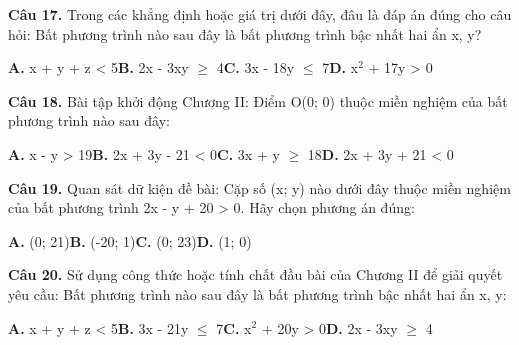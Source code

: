 \documentclass[11pt,a4paper]{article}
\begin{document}
\textbf{\color{primary} Câu 17.} Trong các khẳng định hoặc giá trị dưới đây, đâu là đáp án đúng cho câu hỏi: Bất phương trình nào sau đây là bất phương trình bậc nhất hai ẩn x, y?\par
\hspace*{1.5em}\textbf{A.} x + y + z < 5\quad\quad \textbf{B.} 2x - 3xy $\ge$ 4\quad\quad \textbf{C.} 3x - 18y $\le$ 7\quad\quad \textbf{D.} x$^2$ + 17y > 0\par\vspace{2pt}
\textbf{\color{primary} Câu 18.} Bài tập khởi động Chương II: Điểm O(0; 0) thuộc miền nghiệm của bất phương trình nào sau đây:\par
\hspace*{1.5em}\textbf{A.} x - y > 19\quad\quad \textbf{B.} 2x + 3y - 21 < 0\quad\quad \textbf{C.} 3x + y $\ge$ 18\quad\quad \textbf{D.} 2x + 3y + 21 < 0\par\vspace{2pt}
\textbf{\color{primary} Câu 19.} Quan sát dữ kiện đề bài: Cặp số (x; y) nào dưới đây thuộc miền nghiệm của bất phương trình 2x - y + 20 > 0. Hãy chọn phương án đúng:\par
\hspace*{1.5em}\textbf{A.} (0; 21)\quad\quad \textbf{B.} (-20; 1)\quad\quad \textbf{C.} (0; 23)\quad\quad \textbf{D.} (1; 0)\par\vspace{2pt}
\textbf{\color{primary} Câu 20.} Sử dụng công thức hoặc tính chất đầu bài của Chương II để giải quyết yêu cầu: Bất phương trình nào sau đây là bất phương trình bậc nhất hai ẩn x, y:\par
\hspace*{1.5em}\textbf{A.} x + y + z < 5\quad\quad \textbf{B.} 3x - 21y $\le$ 7\quad\quad \textbf{C.} x$^2$ + 20y > 0\quad\quad \textbf{D.} 2x - 3xy $\ge$ 4\par\vspace{2pt}
\end{document}
